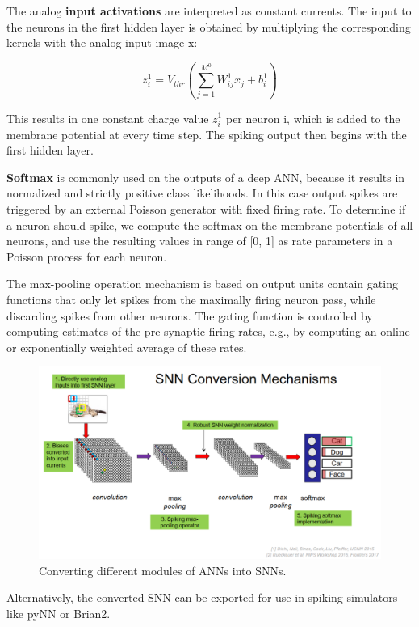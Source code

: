\documentclass[main]{subfiles}
\begin{document}
The analog \textbf{input activations} are interpreted as constant currents. The input to the neurons in the first hidden layer is obtained by multiplying the corresponding kernels with the analog input image x:

\begin{equation}
    z_i^1 = V_{thr}\left(\sum_{j=1}^{M^0}W_{ij}^1 x_j+b_{i}^1\right)
\end{equation}

This results in one constant charge value $z_i^1$ per neuron i, which is added to the membrane potential at every time step. The spiking output then begins with the first hidden layer.

\textbf{Softmax} is commonly used on the outputs of a deep ANN, because it results in normalized and strictly positive class likelihoods. In this case output spikes are triggered by an external Poisson generator with fixed firing rate. To determine if a neuron should spike, we compute the softmax on the membrane potentials of all neurons, and use the resulting values in range of [0, 1] as rate parameters in a Poisson process for
each neuron.

The max-pooling operation mechanism is based on output units contain gating functions that only let spikes from the maximally firing neuron pass, while discarding spikes from other neurons. The gating function is controlled by computing estimates of the pre-synaptic firing rates, e.g., by computing an online or exponentially weighted average of these rates.

%
\begin{figure}[h]
    \centering
    \includegraphics[width=0.8\linewidth]{11_NeuromorphicSystems1/figures/conversion.PNG}
    \caption{Converting different modules of ANNs into SNNs.}
    \label{fig:dvs}
\end{figure}
%

Alternatively, the converted SNN can be exported for use in spiking simulators like pyNN or
Brian2.
\end{document}
